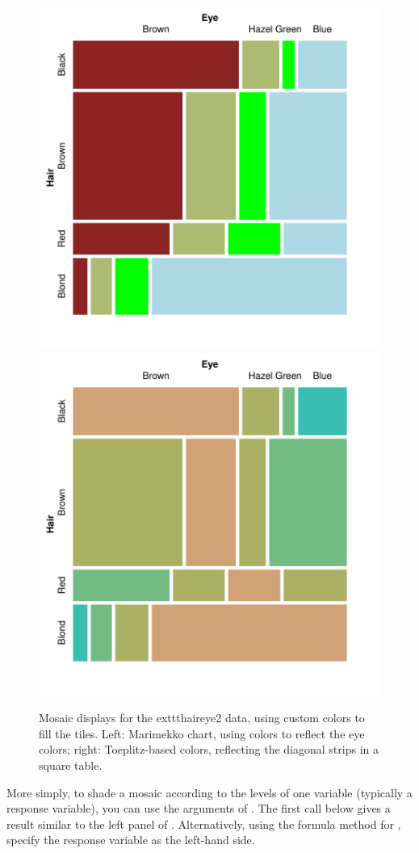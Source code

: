 \documentclass[10pt,krantz2]{krantz}\usepackage[]{graphicx}\usepackage[]{color}
\newenvironment{knitrout}{}{} %
\renewenvironment{knitrout}{\small\renewcommand{\baselinestretch}{.85}}{} %
\begin{document}
\begin{knitrout}
\begin{figure}[!htbp]
\centerline{\includegraphics[width=.49\textwidth]{ch05/fig/HE-fill-1} 
\includegraphics[width=.49\textwidth]{ch05/fig/HE-fill-2} }

\caption[Mosaic displays for the 	exttt{haireye2} data, using custom colors to fill the tiles]{Mosaic displays for the 	exttt{haireye2} data, using custom colors to fill the tiles. Left: Marimekko chart, using colors to reflect the eye colors; right: Toeplitz-based colors, reflecting the diagonal strips in a square table.\label{fig:HE-fill}}
\end{figure}


\end{knitrout}


More simply, to shade a mosaic according to the levels of one variable (typically a response variable),
you can use the  arguments of .
The first call below gives a result similar to the left panel of .
Alternatively, using the formula method for , specify the response
variable as the left-hand side.
\end{document}
